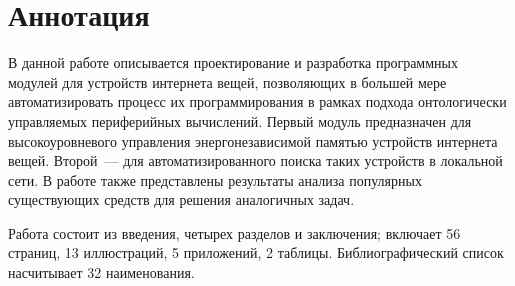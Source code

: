 \hidefromtoc
\chapter*{Аннотация}
\unhidefromtoc

В данной работе описывается проектирование и разработка программных модулей для устройств интернета вещей, позволяющих в большей мере автоматизировать процесс их программирования в рамках подхода онтологически управляемых периферийных вычислений.
Первый модуль предназначен для высокоуровневого управления энергонезависимой памятью устройств интернета вещей.
Второй~--- для автоматизированного поиска таких устройств в локальной сети.
В работе также представлены результаты анализа популярных существующих средств для решения аналогичных задач.

Работа состоит из введения, четырех разделов и заключения; включает 56 страниц, 13 иллюстраций, 5 приложений, 2 таблицы. Библиографический список насчитывает 32 наименования.